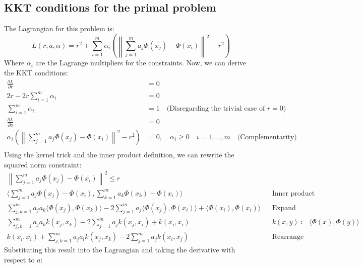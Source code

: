 \documentclass{article}
\begin{document}
\subsection{KKT conditions for the primal problem}

The Lagrangian for this problem is:
\[ L(r, a, \alpha) = r^2 + \sum_{i=1}^{m} \alpha_i \left( \left\| \sum_{j=1}^{m} a_j \Phi(x_j) - \Phi(x_i) \right\|^2 - r^2 \right) \]
Where \( \alpha_i \) are the Lagrange multipliers for the constraints.
Now, we can derive the KKT conditions:
\begin{align*}
\frac{\partial L}{\partial r} &= 0\\
2r - 2r\sum_{i=1}^{m} \alpha_i &= 0\\
\sum_{i=1}^{m} \alpha_i &= 1 \quad \text{(Disregarding the trivial case of $r = 0$)}\\
\frac{\partial L}{\partial a} &= 0 \\
\alpha_i \left( \left\| \sum_{j=1}^{m} a_j \Phi(x_j) - \Phi(x_i) \right\|^2 - r^2 \right) &= 0,\quad \alpha_i \geq 0 \quad i = 1, \dots, m \quad\text{(Complementarity)} \\
\end{align*}
Using the kernel trick and the inner product definition, we can rewrite the squared norm constraint:
\begin{align*}
    \left\| \sum_{j=1}^{m} a_j \Phi(x_j) - \Phi(x_i) \right\|^2 \leq r \\
    \langle \sum_{j=1}^{m} a_j \Phi(x_j) - \Phi(x_i), \sum_{k=1}^{m} a_k \Phi(x_k) - \Phi(x_i) \rangle & & \text{Inner product} \\
    \sum_{j, k=1}^{m} a_j a_k \langle \Phi(x_j), \Phi(x_k) \rangle - 2 \sum_{j=1}^{m} a_j \langle \Phi(x_j), \Phi(x_i) \rangle + \langle \Phi(x_i), \Phi(x_i) \rangle & & \text{Expand} \\
    \sum_{j, k=1}^{m} a_j a_k k(x_j, x_k) - 2 \sum_{j=1}^{m} a_j k(x_j, x_i) + k(x_i, x_i) &  & k(x, y) \coloneqq \langle \Phi(x), \Phi(y) \rangle \\
    k(x_i, x_i) + \sum_{j,k=1}^{m} a_j a_l k(x_j, x_k) - 2 \sum_{j=1}^ {m} a_j k(x_i, x_j) & &\text{Rearrange}
\end{align*}
Substituting this result into the Lagrangian and taking the derivative with respect to $a$:
\end{document}
